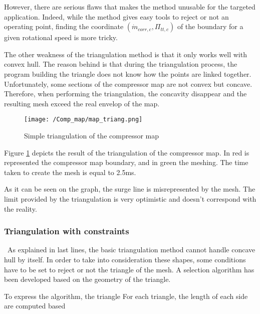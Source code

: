 However, there are serious flaws that makes the method unusable for the targeted application. Indeed, while the method gives easy tools to reject or not an operating point, finding the coordinate $(\dot{m}_{corr,c},\Pi_{tt,c})$ of the boundary for a given rotational speed is more tricky. 

The other weakness of the triangulation method is that it only works well with convex hull. The reason behind is that during the triangulation process, the program building the triangle does not know how the points are linked together. Unfortunately, some sections of the compressor map are not convex but concave. Therefore, when performing the triangulation, the concavity disappear and the resulting mesh exceed the real envelop of the map.

\begin{figure}[h]
    \centering
    \texttt{[image: /Comp\_map/map\_triang.png]}
    \caption{Simple triangulation of the compressor map}
    \label{fig:C7_trimap}
\end{figure}
Figure \ref{fig:C7_trimap} depicts the result of the triangulation of the compressor map. In red is represented the compressor map boundary, and in green the meshing. The time taken to create the mesh is equal to 2.5ms.

As it can be seen on the graph, the surge line is misrepresented by the mesh. The limit provided by the triangulation is very optimistic and doesn't correspond with the reality. 

\subsubsection{Triangulation with constraints}
\quad\ As explained in last lines, the basic triangulation method cannot handle concave hull by itself. In order to take into consideration these shapes, some conditions have to be set to reject or not the triangle of the mesh. A selection algorithm  has been developed \cite{} based on the geometry of the triangle.

To express the algorithm, the triangle 
For each triangle, the length of each side are computed based 


